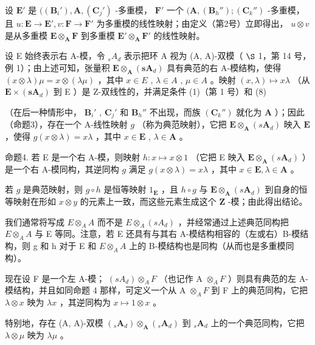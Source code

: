 设 \(\mathbf{E}'\) 是 \(((\mathbf{B}_i'),\mathbf{A},(\mathbf{C}_j')\) -多重模， \(\mathbf{F}'\) 一个 \((\mathbf{A},(\mathbf{B}_h'');(\mathbf{C}_k'')\) -多重模，且 \(u:\mathbf{E}\to \mathbf{E}',v:\mathbf{F}\to \mathbf{F}'\) 为多重模的线性映射；由定义（第2号）立即得出， \(u\otimes v\) 是从多重模 \(\mathbf{E}\otimes_{\mathbf{A}}\mathbf{F}\) 到多重模 \(\mathbf{E}'\otimes_{\mathbf{A}}\mathbf{F}'\) 的线性映射。

设 E 始终表示右 A-模，令 \(_{s}A_{d}\) 表示把环 A 视为 (A, A)-双模（ \(\S\) 1，第 14 号，例 1）；由上述可知，张量积 \(\mathbf{E} \otimes_{\mathbf{A}} (\mathbf{s}\mathbf{A}_{d})\) 具有典范的右 A-模结构，使得 \((x \otimes \lambda)\mu = x \otimes (\lambda\mu)\) ，其中 \(x \in E\) , \(\lambda \in A\) , \(\mu \in A\) 。映射 \((x, \lambda) \mapsto x\lambda\) （从 \(\mathbf{E} \times (\mathbf{s}\mathbf{A}_{d})\) 到 E ）是 Z-双线性的，并满足条件 (1)（第 1 号）和 (8)

（在后一种情形中， \(\mathbf{B}_i'\) , \(\mathbf{C}_j'\) 和 \(\mathbf{B}_h''\) 不出现，而族 \((\mathbf{C}_k'')\) 就化为 \(\mathbf{A}\) ）；因此（命题3），存在一个 A-线性映射 \(g\) （称为典范映射），它把 \(\mathbf{E} \otimes_{\mathbf{A}} (s\mathbf{A}_d)\) 映入 \(\mathbf{E}\) ，使得 \(g(x \otimes \lambda) = x\lambda\) ，其中 \(x \in \mathbf{E}\) , \(\lambda \in \mathbf{A}\) 。

命题4. 若 E 是一个右 A-模，则映射 \(h: x \mapsto x \otimes 1\) （它把 E 映入 \(\mathbf{E} \otimes_{\mathbf{A}} (s\mathbf{A}_d)\) ）是一个右 A-模同构，其逆同构 \(g\) 满足 \(g(x \otimes \lambda) = x\lambda\) ，其中 \(x \in \mathbf{E}, \lambda \in \mathbf{A}\) 。

若 \(g\) 是典范映射，则 \(g \circ h\) 是恒等映射 \(1_{\mathbf{E}}\) ，且 \(h \circ g\) 与 \(\mathbf{E} \otimes_{\mathbf{A}} (s\mathbf{A}_d)\) 到自身的恒等映射在形如 \(x \otimes y\) 的元素上一致，而这些元素生成这个 \(\mathbf{Z}\) -模；由此得出结论。

我们通常将写成 \(E \otimes_{A} A\) 而不是 \(E \otimes_{A} (s A_{d})\) ，并经常通过上述典范同构把 \(E \otimes_{A} A\) 与 E 等同。注意，若 E 还具有与其右 A-模结构相容的（左或右）B-模结构，则 g 和 h 对于 E 和 \(E \otimes_{A} A\) 上的 B-模结构也是同构（从而也是多重模同构）。

现在设 F 是一个左 A-模； \((sA_{d}) \otimes_{A} F\) （也记作 A \(\otimes_{A} F\) ）则具有典范的左 A-模结构，并且如同命题 4 那样，可定义一个从 A \(\otimes_{A} F\) 到 F 上的典范同构，它把 \(\lambda \otimes x\) 映为 \(\lambda x\) ，其逆同构为 \(x \mapsto 1 \otimes x\) 。

特别地，存在 (A, A)-双模 \((_{s}\mathbf{A}_{d})\otimes_{\mathbf{A}}(_{s}\mathbf{A}_{d})\) 到 \({}_{s}\mathbf{A}_{d}\) 上的一个典范同构，它把 \(\lambda \otimes \mu\) 映为 \(\lambda \mu\) 。

